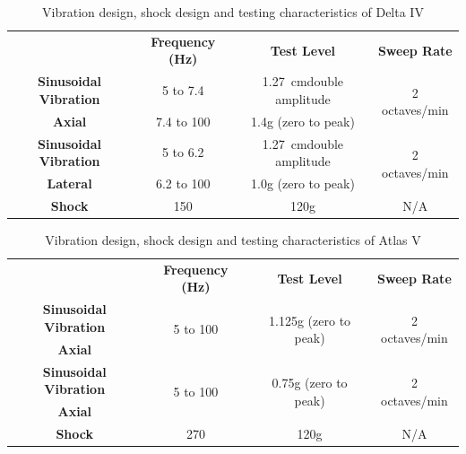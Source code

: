 \begin{table}[H]
\centering
\caption[Vibration design, shock design and testing characteristics of Delta IV]{Vibration design, shock design and testing characteristics of Delta IV \cite{delta_launch}}
\begin{tabular}{|c|c|c|c|}
\hline
	&	\textbf{Frequency (Hz)}	&	\textbf{Test Level}	&	\textbf{Sweep Rate}	\\\hhline{|=|=|=|=|}
{\textbf{Sinusoidal Vibration}}	&	5 to 7.4	&	\SI{1.27}{\centi\metre}double amplitude	&	\multirow{2}{*}{2 octaves/min}	\\\cline{2-3}
{\textbf{Axial}}	&	7.4 to 100	&	1.4g (zero to peak)	&	\\\hline
{\textbf{Sinusoidal Vibration}}	&	5 to 6.2	&	\SI{1.27}{\centi\metre}double amplitude	&	\multirow{2}{*}{2 octaves/min}	\\\cline{2-3}
{\textbf{Lateral}}	&	6.2 to 100	&	1.0g (zero to peak)	&	\\\hline
\textbf{Shock}	&	150	&	120g	&	N/A	\\\hline

\end{tabular}
\label{delta_launch}
\end{table}

\begin{table}[H]
\centering
\caption[Vibration design, shock design and testing characteristics of Atlas V]{Vibration design, shock design and testing characteristics of Atlas V \cite{atlas_launch}}
\begin{tabular}{|c|c|c|c|}
\hline
	&	\textbf{Frequency (Hz)}	&	\textbf{Test Level}	&	\textbf{Sweep Rate}	\\\hhline{|=|=|=|=|}
{\textbf{Sinusoidal Vibration}}	&	\multirow{2}{*}{5 to 100}	&	\multirow{2}{*}{1.125g (zero to peak)}	&	\multirow{2}{*}{2 octaves/min}	\\
{\textbf{Axial}}	&		&		&	\\\hline
{\textbf{Sinusoidal Vibration}}	&	\multirow{2}{*}{5 to 100}	&	\multirow{2}{*}{0.75g (zero to peak)}	&	\multirow{2}{*}{2 octaves/min}	\\
{\textbf{Axial}}	&		&		&	\\\hline
\textbf{Shock}	&	270	&	120g	&	N/A	\\\hline
\end{tabular}
\label{atlas_launch}
\end{table}



